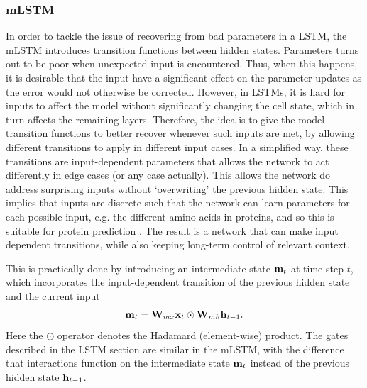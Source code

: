 \documentclass[a4paper,12pt]{article}
\begin{document}
\subsubsection{mLSTM}
In order to tackle the issue of recovering from bad parameters in a LSTM, the mLSTM introduces transition functions between hidden states. Parameters turns out to be poor when unexpected input is encountered. Thus, when this happens, it is desirable that the input have a significant effect on the parameter updates as the error would not otherwise be corrected. However, in LSTMs, it is hard for inputs to affect the model without significantly changing the cell state, which in turn affects the remaining layers. Therefore, the idea is to give the model transition functions to better recover whenever such inputs are met, by allowing different transitions to apply in different input cases. In a simplified way, these transitions are input-dependent parameters that allows the network to act differently in edge cases (or any case actually). This allows the network do address surprising inputs without `overwriting' the previous hidden state. This implies that inputs are discrete such that the network can learn parameters for each possible input, e.g. the different amino acids in proteins, and so this is suitable for protein prediction \cite{krause2016multiplicative}. The result is a network that can make input dependent transitions, while also keeping long-term control of relevant context.

This is practically done by introducing an intermediate state $\mathbf{ m }_t$ at time step $t$, which incorporates the input-dependent transition of the previous hidden state and the current input
\[ \mathbf{ m }_t = \mathbf{ W }_{mx} \mathbf{ x }_t \odot \mathbf{ W }_{mh} \mathbf{ h }_{t-1}. \]
Here the $\odot$ operator denotes the Hadamard (element-wise) product. The gates described in the LSTM section are similar in the mLSTM, with the difference that interactions function on the intermediate state $\mathbf{ m }_t$ instead of the previous hidden state $\mathbf{ h }_{t-1}$. 

\end{document}

